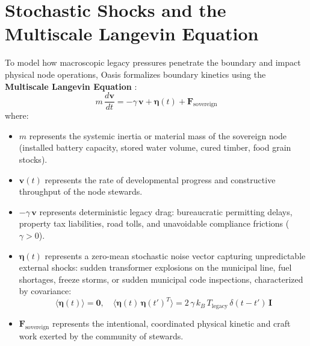 \section{Stochastic Shocks and the Multiscale Langevin Equation}
\label{sec:langevin_shocks}

To model how macroscopic legacy pressures penetrate the boundary and impact physical node operations, Oasis formalizes boundary kinetics using the \textbf{Multiscale Langevin Equation} \cite{lemons2002introduction}:
\begin{equation}
m \, \frac{d\mathbf{v}}{dt} = -\gamma \, \mathbf{v} + \boldsymbol{\eta}(t) + \mathbf{F}_{\mathrm{sovereign}}
\label{eq:langevin_equation}
\end{equation}
where:
\begin{itemize}
    \item $m$ represents the systemic inertia or material mass of the sovereign node (installed battery capacity, stored water volume, cured timber, food grain stocks).
    \item $\mathbf{v}(t)$ represents the rate of developmental progress and constructive throughput of the node stewards.
    \item $-\gamma \, \mathbf{v}$ represents deterministic legacy drag: bureaucratic permitting delays, property tax liabilities, road tolls, and unavoidable compliance frictions ($\gamma > 0$).
    \item $\boldsymbol{\eta}(t)$ represents a zero-mean stochastic noise vector capturing unpredictable external shocks: sudden transformer explosions on the municipal line, fuel shortages, freeze storms, or sudden municipal code inspections, characterized by covariance:
    \begin{equation}
    \langle \boldsymbol{\eta}(t) \rangle = \mathbf{0}, \quad \langle \boldsymbol{\eta}(t) \, \boldsymbol{\eta}(t')^T \rangle = 2 \, \gamma \, k_B \, T_{\mathrm{legacy}} \, \delta(t - t') \, \mathbf{I}
    \label{eq:noise_covariance}
    \end{equation}
    \item $\mathbf{F}_{\mathrm{sovereign}}$ represents the intentional, coordinated physical kinetic and craft work exerted by the community of stewards.
\end{itemize}

